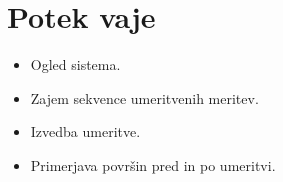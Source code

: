 \documentclass[letterpaper,10pt,english]{sphinxmanual}
\begin{document}
\section{Potek vaje}
\label{\detokenize{kalibracija:potek-vaje}}\begin{itemize}
\item {} 
\sphinxAtStartPar
Ogled sistema.

\item {} 
\sphinxAtStartPar
Zajem sekvence umeritvenih meritev.

\item {} 
\sphinxAtStartPar
Izvedba umeritve.

\item {} 
\sphinxAtStartPar
Primerjava površin pred in po umeritvi.

\end{itemize}
\end{document}
